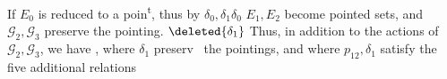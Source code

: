 If $E_0$ is reduced to a poin\textsuperscript{t}, thus by $\delta_0,\delta_1\delta_0$ $E_1,E_2$ become pointed sets, and $\mathcal G_2,\mathcal G_3$ preserve the pointing.
$\deleted{\delta_1}$ 
Thus, in addition to the actions of $\mathcal G_2,\mathcal G_3$, we have
, where $\delta_1$  preserv%
\ the pointings, and where $p_{12},\delta_1$ satisfy the five additional relations
